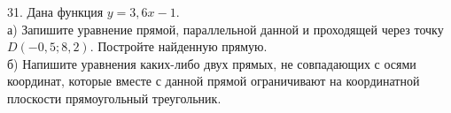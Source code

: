 31. Дана функция $y=3,6x-1.$\\
а) Запишите уравнение прямой, параллельной данной и проходящей через точку $D(-0,5;8,2).$ Постройте найденную прямую.\\
б) Напишите уравнения каких-либо двух прямых, не совпадающих с осями координат, которые вместе с данной прямой ограничивают на координатной плоскости прямоугольный треугольник.\\
